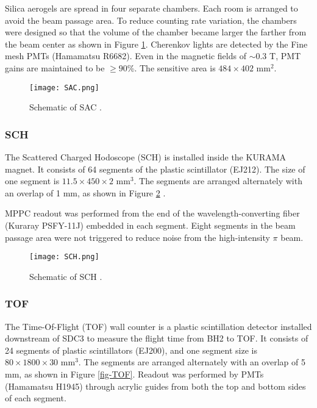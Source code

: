 Silica aerogels are spread in four separate chambers. Each room is arranged to avoid the beam passage area.
To reduce counting rate variation, the chambers were designed so that the volume of the chamber became larger the farther from the beam center as shown in Figure \ref{fig-SAC}. Cherenkov lights are detected by the Fine mesh PMTs (Hamamatsu R6682). Even in the magnetic fields of $\sim$0.3 T, PMT gains are maintained to be $\geq90$\%. The sensitive area is $484\times402$ mm$^2$.

\begin{figure}[!h]
 \begin{center}
   \texttt{[image: SAC.png]}
   \caption{Schematic of SAC \cite{Koba-2016}.}
   \label{fig-SAC}
 \end{center}
\end{figure}

\subsubsection{SCH}
The Scattered Charged Hodoscope (SCH) is installed inside the KURAMA magnet. It consists of 64 segments of the plastic scintillator (EJ212). The size of one segment is $11.5\times450\times2$ mm$^3$. The segments are arranged alternately with an overlap of 1 mm, as shown in Figure \ref{fig-SCH} \cite{Nana-D}. 

MPPC readout was performed from the end of the wavelength-converting fiber (Kuraray PSFY-11J) embedded in each segment. Eight segments in the beam passage area were not triggered to reduce noise from the high-intensity $\pi$ beam.

\begin{figure}[!h]
 \begin{center}
   \texttt{[image: SCH.png]}
   \caption{Schematic of SCH \cite{Nana-D}.}
   \label{fig-SCH}
 \end{center}
\end{figure}

%
\subsubsection{TOF}
The Time-Of-Flight (TOF) wall counter is a plastic scintillation detector installed downstream of SDC3 to measure the flight time from BH2 to TOF. It consists of 24 segments of plastic scintillators (EJ200), and one segment size is $80\times1800\times30$ mm$^3$. The segments are arranged alternately with an overlap of 5 mm, as shown in Figure \ref{fig-TOF}. Readout was performed by PMTs (Hamamatsu H1945) through acrylic guides from both the top and bottom sides of each segment. 

